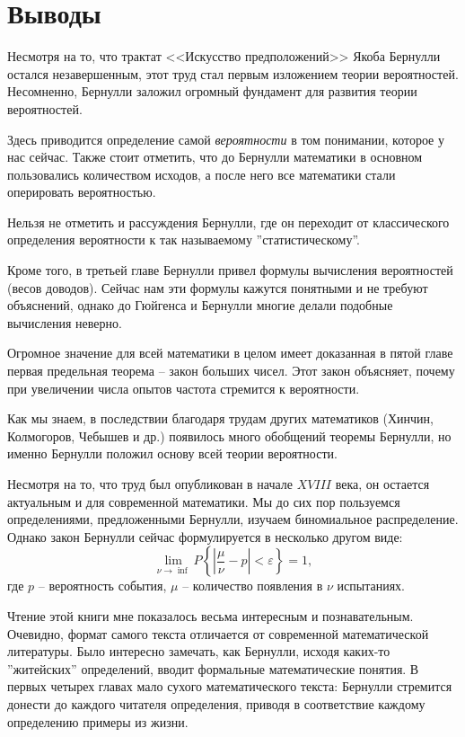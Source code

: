 \documentclass[12pt]{extarticle}
\begin{document}
\newpage
\section{Выводы}
Несмотря на то, что трактат <<Искусство предположений>> Якоба Бернулли остался незавершенным, этот труд стал первым изложением теории вероятностей. 
Несомненно, Бернулли заложил огромный фундамент для развития теории вероятностей.

Здесь приводится определение самой \textit{вероятности} в том понимании, которое у нас сейчас.
Также стоит отметить, что до Бернулли математики в основном пользовались количеством исходов, а после него все математики стали оперировать вероятностью.

Нельзя не отметить и рассуждения Бернулли, где он переходит от классического определения вероятности к так называемому ''статистическому''.

Кроме того, в третьей главе Бернулли привел формулы вычисления вероятностей (весов доводов). Сейчас нам эти формулы кажутся понятными и не требуют объяснений, однако до Гюйгенса и Бернулли многие делали подобные вычисления неверно.

Огромное значение для всей математики в целом имеет доказанная в пятой главе первая предельная теорема -- закон больших чисел.
Этот закон объясняет, почему при увеличении числа опытов частота стремится к вероятности.

Как мы знаем, в последствии благодаря трудам других математиков (Хинчин, Колмогоров, Чебышев и др.) появилось много обобщений теоремы Бернулли, но именно Бернулли положил основу всей теории вероятности.

Несмотря на то, что труд был опубликован в начале $XVIII$ века, он остается актуальным и для современной математики. 
Мы до сих пор пользуемся определениями, предложенными Бернулли, изучаем биномиальное распределение.
Однако закон Бернулли сейчас формулируется в несколько другом виде:
$$\lim\limits_{\nu \to \inf} P \left\{ \left| \frac{\mu}{\nu} - p\right| < \varepsilon \right\} = 1,$$
 где $p$ -- вероятность события, $\mu$ -- количество появления в $\nu$ испытаниях.
 
Чтение этой книги мне показалось весьма интересным и познавательным. 
Очевидно, формат самого текста отличается от современной математической литературы.
Было интересно замечать, как Бернулли, исходя каких-то ''житейских'' определений, вводит формальные математические понятия.
В первых четырех главах мало сухого математического текста: Бернулли стремится донести до каждого читателя определения, приводя в соответствие каждому определению примеры из жизни.
\end{document}

